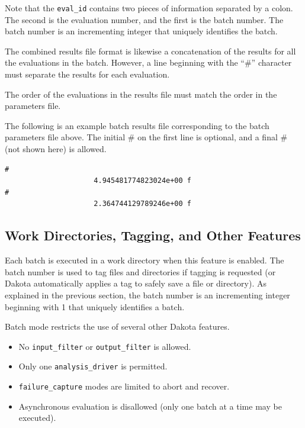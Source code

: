 Note that the \texttt{eval\_id} contains two pieces of 
information separated by a colon. The second is the evaluation number,
and the first is the batch number. The batch number is an incrementing
integer that uniquely identifies the batch.

The combined results file format is likewise a concatenation of the results
for all the evaluations in the batch. However, a line beginning with the
``\#'' character must separate the results for each evaluation.

The order of the evaluations in the results file must match the order in the
parameters file.

The following is an example batch results file corresponding to the batch
parameters file above. The initial \# on the first line is optional, and a
final \# (not shown here) is allowed.
\begin{small}
\begin{verbatim}
#
                     4.945481774823024e+00 f
#
                     2.364744129789246e+00 f
\end{verbatim}
\end{small}


\subsection{Work Directories, Tagging, and Other Features}

Each batch is executed in a work directory when this feature is enabled.
The batch number is used to tag files and directories if tagging is requested
(or Dakota automatically applies a tag to safely save a file or directory). As
explained in the previous section, the batch number is an incrementing integer
beginning with 1 that uniquely identifies a batch.

Batch mode restricts the use of several other Dakota features.

\begin{itemize}

  \item No \texttt{input\_filter} or \texttt{output\_filter} is allowed.
  \item Only one \texttt{analysis\_driver} is permitted.
  \item \texttt{failure\_capture} modes are limited to abort and recover.
  \item Asynchronous evaluation is disallowed (only one batch at a time may be executed).
\end{itemize}


